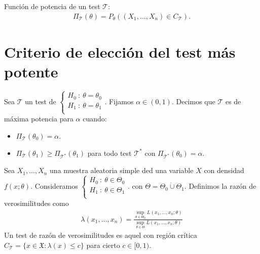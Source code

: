 \begin{defi}
    Función de potencia de un test $\mathcal{T}$:
    \begin{align*}
        \Pi_{\mathcal{T}}(\theta) = P_{\theta}((X_1,...,X_n) \in C_{\mathcal{T}}).
    \end{align*}
\end{defi}

\section{Criterio de elección del test más potente}

\begin{defi}
    Sea $\mathcal{T}$ un test de $
        \left\{ \begin{array}{lcc}
            H_0 \ : \ \theta = \theta_0 \\
            H_1 \ : \ \theta = \theta_1 \\
        \end{array}
        \right.
    $. Fijamos $\alpha \in (0,1)$. Decimos que $\mathcal{T}$ es de máxima potencia para $\alpha$ cuando:
    \begin{itemize}
        \item $\Pi_{\mathcal{T}}(\theta_0) = \alpha$.
        \item $\Pi_{\mathcal{T}}(\theta_1) \ge \Pi_{\mathcal{T}^*}(\theta_1)$ para todo test $\mathcal{T}^*$ con $\Pi_{\mathcal{T}^*}(\theta_0) = \alpha$.
    \end{itemize}
\end{defi}

\begin{defi}
    Sea $X_1,...,X_n$ una muestra aleatoria simple ded una variable $X$ con densidad $f(x;\theta)$. Consideramos $
        \left\{ \begin{array}{lcc}
            H_0 \ : \ \theta \in \Theta_0 \\
            H_1 \ : \ \theta \in \Theta_1 \\
        \end{array}
        \right.
    $. con $\Theta = \Theta_0 \dot\cup \Theta_1$. Definimos la razón de verosimilitudes como
    \begin{align*}
        \lambda(x_1,...,x_n) = \frac{\sup_{\theta \in \Theta_0} L(x_1,...,x_n;\theta)}{\sup_{\theta \in \Theta} L(x_1,...,x_n;\theta)}
    \end{align*}
    Un test de razón de  verosimilitudes es aquel con región crítica $C_{\mathcal{T}} = \{ x \in \mathfrak{X} : \lambda(x) \leq c \}$ para cierto $c \in [0,1)$.
\end{defi}


